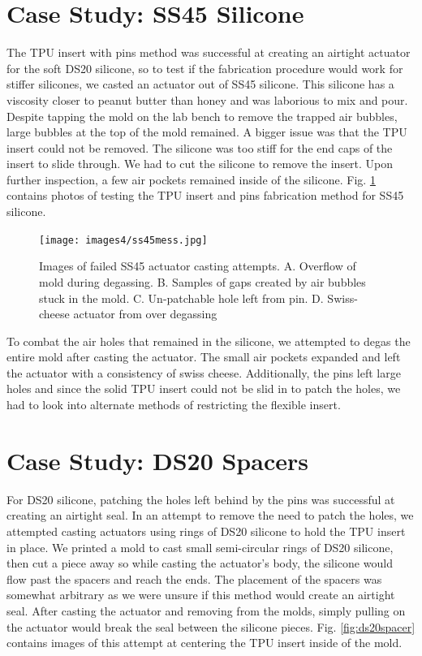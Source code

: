 \section{Case Study: SS45 Silicone}
The TPU insert with pins method was successful at creating an airtight actuator for the soft DS20 silicone, so to test if the fabrication procedure would work for stiffer silicones, we casted an actuator out of SS45 silicone. This silicone has a viscosity closer to peanut butter than honey and was laborious to mix and pour. Despite tapping the mold on the lab bench to remove the trapped air bubbles, large bubbles at the top of the mold remained. A bigger issue was that the TPU insert could not be removed. The silicone was too stiff for the end caps of the insert to slide through. We had to cut the silicone to remove the insert. Upon further inspection, a few air pockets remained inside of the silicone. Fig. \ref{fig:ss45mess} contains photos of testing the TPU insert and pins fabrication method for SS45 silicone. 

\begin{figure}[h]
    \centering
    \texttt{[image: images4/ss45mess.jpg]}
    \caption{Images of failed SS45 actuator casting attempts. A. Overflow of mold during degassing. B. Samples of gaps created by air bubbles stuck in the mold. C. Un-patchable hole left from pin. D. Swiss-cheese actuator from over degassing}
    \label{fig:ss45mess}
\end{figure}

To combat the air holes that remained in the silicone, we attempted to degas the entire mold after casting the actuator. The small air pockets expanded and left the actuator with a consistency of swiss cheese. Additionally, the pins left large holes and since the solid TPU insert could not be slid in to patch the holes, we had to look into alternate methods of restricting the flexible insert. 

\section{Case Study: DS20 Spacers}
For DS20 silicone, patching the holes left behind by the pins was successful at creating an airtight seal. In an attempt to remove the need to patch the holes, we attempted casting actuators using rings of DS20 silicone to hold the TPU insert in place. We printed a mold to cast small semi-circular rings of DS20 silicone, then cut a piece away so while casting the actuator's body, the silicone would flow past the spacers and reach the ends. The placement of the spacers was somewhat arbitrary as we were unsure if this method would create an airtight seal. After casting the actuator and removing from the molds, simply pulling on the actuator would break the seal between the silicone pieces. Fig. \ref{fig:ds20spacer} contains images of this attempt at centering the TPU insert inside of the mold. 

